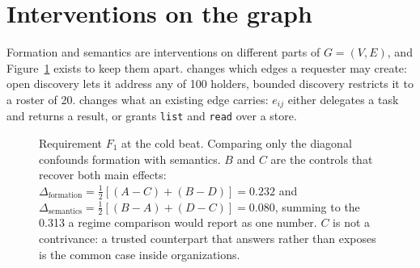\section{Interventions on the graph}
\label{sec:operational}

Formation and semantics are interventions on different parts of $G = (V, E)$, and
Figure~\ref{fig:twobytwo} exists to keep them apart.  changes which
edges a requester may create: open discovery lets it address any of 100 holders,
bounded discovery restricts it to a roster of 20.  changes what an
existing edge carries: $e_{ij}$ either delegates a task and returns a result, or grants
\texttt{list} and \texttt{read} over a store.

\begin{figure}[t]
\centering
{}
\caption{Requirement $F_1$ at the cold beat. Comparing only the diagonal confounds
formation with semantics. $B$ and $C$ are the controls that recover both main effects:
$\Delta_\text{formation} = \frac{1}{2}[(A-C)+(B-D)] = 0.232$ and
$\Delta_\text{semantics} = \frac{1}{2}[(B-A)+(D-C)] = 0.080$, summing to the 0.313 a
regime comparison would report as one number. $C$ is not a contrivance: a trusted
counterpart that answers rather than exposes is the common case inside organizations.}
\label{fig:twobytwo}
\end{figure}

